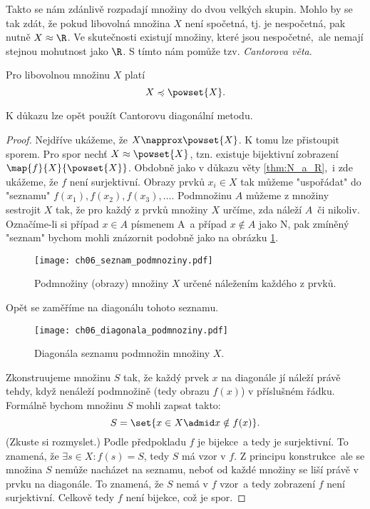 Takto se nám zdánlivě rozpadají množiny do dvou velkých skupin. Mohlo by se tak zdát, že pokud libovolná množina $X$ není spočetná, tj. je nespočetná, pak nutně $X\approx\R$. Ve skutečnosti existují množiny, které jsou nespočetné,~ale nemají stejnou mohutnost jako $\R$. S tímto nám pomůže tzv. \emph{Cantorova věta}.
\begin{theorem}[Cantorova]
    Pro libovolnou množinu $X$ platí
    \begin{equation*}
        X\preccurlyeq\powset{X}.
    \end{equation*}
\end{theorem}
K důkazu lze opět použít Cantorovu diagonální metodu.
\begin{proof}
    Nejdříve ukážeme, že $X\napprox\powset{X}$. K tomu lze přistoupit sporem. Pro spor nechť $X\approx\powset{X}$, tzn. existuje bijektivní zobrazení $\map{f}{X}{\powset{X}}$. Obdobně jako v důkazu věty \ref{thm:N_a_R},~i zde ukážeme, že $f$ není surjektivní. Obrazy prvků $x_i\in X$ tak můžeme "uspořádat" do "seznamu" $f(x_1),f(x_2),f(x_3),\dots$. Podmnožinu $A$ můžeme z množiny sestrojit $X$ tak, že pro každý z prvků množiny $X$ určíme, zda náleží $A$~či nikoliv. Označíme-li si případ $x\in A$ písmenem A~a případ $x\notin A$ jako N, pak zmíněný "seznam" bychom mohli znázornit podobně jako na obrázku \ref{fig:seznam_podmnoziny}.
    \begin{figure}[H]
        \centering
        \texttt{[image: ch06\_seznam\_podmnoziny.pdf]}
        \caption{Podmnožiny (obrazy) množiny $X$ určené náležením každého z prvků.}
        \label{fig:seznam_podmnoziny}
    \end{figure}
    Opět se zaměříme na diagonálu tohoto seznamu.
    \begin{figure}[H]
        \centering
        \texttt{[image: ch06\_diagonala\_podmnoziny.pdf]}
        \caption{Diagonála seznamu podmnožin množiny $X$.}
        \label{fig:diagonala_podmnoziny}
    \end{figure}
    Zkonstruujeme množinu $S$ tak, že každý prvek $x$ na diagonále jí náleží právě tehdy, když nenáleží podmnožině (tedy obrazu $f(x)$) v příslušném řádku. Formálně bychom množinu $S$ mohli zapsat takto:
    \begin{equation*}
        S=\set{x\in X \admid x\notin f(x)}.
    \end{equation*}
    (Zkuste si rozmyslet.) Podle předpokladu $f$ je bijekce~a tedy je surjektivní. To znamená, že $\exists s\in X: f(s)=S$, tedy $S$ má vzor v $f$. Z principu konstrukce~ale se množina $S$ nemůže nacházet na seznamu, neboť od každé množiny se liší právě v prvku na diagonále. To znamená, že $S$ nemá v $f$ vzor~a tedy zobrazení $f$ není surjektivní. Celkově tedy $f$ není bijekce, což je spor.\par

\end{proof}
